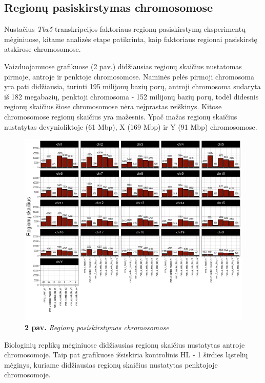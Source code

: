 \documentclass[12pt]{article}
\begin{document}
\newpage

\subsection{Regionų pasiskirstymas chromosomose}
Nustačius \emph{Tbx5} transkripcijos faktoriaus regionų
pasiskirstymą eksperimentų mėginiuose, kitame analizės etape
patikrinta, kaip faktoriaus regionai pasiskirstę atskirose
chromosomose.

Vaizduojamuose grafikuose (2 pav.) didžiausias regionų skaičius nustatomas
pirmoje, antroje ir penktoje chromosomose. Naminės pelės pirmoji
chromosoma yra pati didžiausia, turinti 195 milijonų bazių porų,
antroji chromosoma sudaryta iš 182 megabazių, penktoji chromosoma -
152 milijonų bazių porų, todėl didesnis regionų skaičius šiose
chromosomose nėra neįprastas reiškinys. Kitose chromosomose regionų
skaičius yra mažesnis. Ypač mažas regionų skaičius nustatytas
devynioliktoje (61 Mbp), X (169 Mbp) ir Y (91 Mbp) chromosomose.

\begin{figure}[htb]
    \begin{center}
        \includegraphics[width=0.8\linewidth]{Figures/peak_counts_by_chromosome.png}
        \caption*{\textbf{2 pav.} \emph{Regionų pasiskirstymas chromosomose}}
    \end{center}
\end{figure}

Biologinių replikų mėginiuose didžiausias regionų skaičius
nustatytas antroje chromosomoje. Taip pat grafikuose išsiskiria
kontrolinis HL - 1 širdies ląstelių mėginys, kuriame didžiausias
regionų skaičius nustatytas penktojoje chromosomoje.
\end{document}
